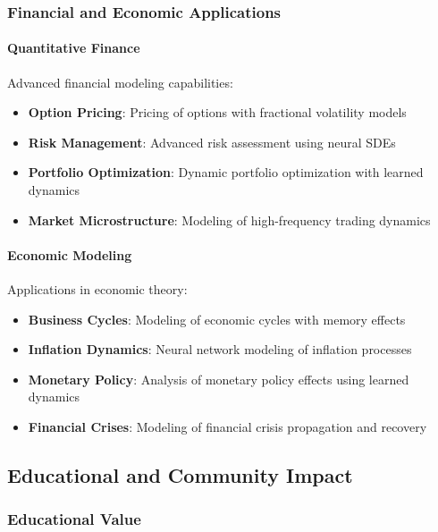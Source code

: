 \subsubsection{Financial and Economic Applications}

\paragraph{Quantitative Finance}
Advanced financial modeling capabilities:

\begin{itemize}
    \item \textbf{Option Pricing}: Pricing of options with fractional volatility models
    \item \textbf{Risk Management}: Advanced risk assessment using neural SDEs
    \item \textbf{Portfolio Optimization}: Dynamic portfolio optimization with learned dynamics
    \item \textbf{Market Microstructure}: Modeling of high-frequency trading dynamics
\end{itemize}

\paragraph{Economic Modeling}
Applications in economic theory:

\begin{itemize}
    \item \textbf{Business Cycles}: Modeling of economic cycles with memory effects
    \item \textbf{Inflation Dynamics}: Neural network modeling of inflation processes
    \item \textbf{Monetary Policy}: Analysis of monetary policy effects using learned dynamics
    \item \textbf{Financial Crises}: Modeling of financial crisis propagation and recovery
\end{itemize}

\subsection{Educational and Community Impact}

\subsubsection{Educational Value}

